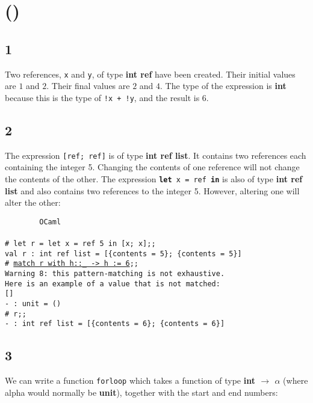 \documentclass[]{book}
\newcommand{\smspace}{\vspace{4mm}}
\begin{document}
\section*{ ()}
\subsection*{1}
Two references, \texttt{x} and \texttt{y}, of type \textbf{\textsf{int ref}} have been created. Their initial values are $1$ and $2$. Their final values are $2$ and $4$. The type of the expression is \textsf{\textbf{int}} because this is the type of \texttt{!x\! +\! !y}, and the result is $6$.

\subsection*{2}
The expression \texttt{[ref;\! ref]} is of type \textbf{\textsf{int ref list}}. It contains two references each containing the integer 5. Changing the contents of one reference will not change the contents of the other. The expression \texttt{\textbf{let}\! x\! =\! ref\! \textbf{in}\! [x;\! x]} is also of type \textbf{\textsf{int ref list}} and also contains two references to the integer 5. However, altering one will alter the other:

\smspace
\noindent\verb!        OCaml!\\
\noindent\\
\noindent\verb!# let r = let x = ref 5 in [x; x];;!\\
\noindent\verb!val r : int ref list = [{contents = 5}; {contents = 5}]!\\
\noindent\texttt{\# \underline{\vphantom{g}match r with h::\_ -> h := 6};;}\\
\noindent\verb!Warning 8: this pattern-matching is not exhaustive.!\\
\noindent\verb!Here is an example of a value that is not matched:!\\
\noindent\verb![]!\\
\noindent\verb!- : unit = ()!\\
\noindent\verb!# r;;!\\
\noindent\verb!- : int ref list = [{contents = 6}; {contents = 6}]!\vphantom{g}

\subsection*{3}
We can write a function \texttt{forloop} which takes a function of type \textsf{\textbf{int $\rightarrow$ $\alpha$}} (where alpha would normally be \textbf{\textsf{unit}}), together with the start and end numbers:
\end{document}
